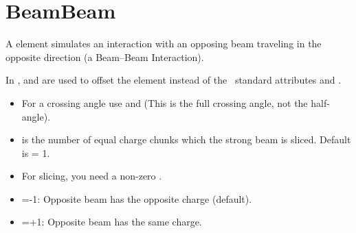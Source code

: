 \section{BeamBeam}
\label{s:bbi}

A  element simulates an interaction with an opposing beam traveling in
the opposite direction (a Beam--Beam Interaction). 

\begin{table}[h]
\end{table}

In \bmad,  and  are used to offset the
 element instead of the \mad\ standard attributes
 and .
\begin{itemize}
\item For a crossing angle use  and  (This is the full crossing angle,
not the half-angle).
\item {} is the number of equal charge chunks which the strong beam is sliced.
      Default is  = 1.
\item For slicing, you need a non-zero .
\item {}=-1: Opposite beam has the opposite charge (default).
\item {}=+1: Opposite beam has the same charge.   
\end{itemize}

